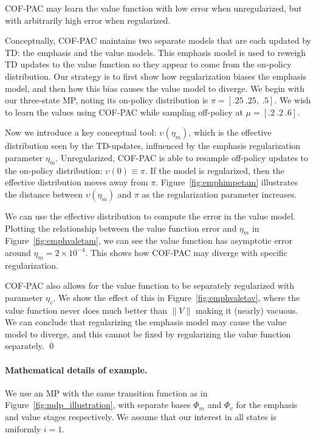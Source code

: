 \begin{example}\label{ex:emph}
	COF-PAC may learn the value function with low error when unregularized, but with arbitrarily high error when regularized.

	\proof Conceptually, COF-PAC maintains two separate models that are each updated by TD: the emphasis and the value models. This emphasis model is used to reweigh TD updates to the value function so they appear to come from the on-policy distribution. Our strategy is to first show how regularization biases the emphasis model, and then how this bias causes the value model to diverge.
	We begin with our three-state MP, noting its on-policy distribution is $\pi=[.25~.25,~.5]$. We wish to learn the values using COF-PAC while sampling off-policy at $\mu=[.2~.2~.6]$.

	Now we introduce a key conceptual tool: $\upsilon(\eta_m)$, which is the effective distribution seen by the TD-updates, influenced by the emphasis regularization parameter $\eta_m$. Unregularized, COF-PAC is able to resample off-policy updates to the on-policy distribution:  $\upsilon(0) \equiv \pi$. If the model is regularized, then the effective distribution moves away from $\pi$. Figure~\ref{fig:emphimpetam} illustrates the distance between $\upsilon(\eta_m)$ and $\pi$ as the regularization parameter increases.

	We can use the effective distribution to compute the error in the value model. Plotting the relationship between the value function error and $\eta_m$ in Figure~\ref{fig:emphvaletam}, we can see the value function has asymptotic error around $\eta_m=2\times 10^{-4}$. This shows how COF-PAC may diverge with specific regularization.

	COF-PAC also allows for the value function to be separately regularized with parameter $\eta_v$. We show the effect of this in Figure~\ref{fig:emphvaletav}, where the value function never does much better than $\|V\|$ making it (nearly) vacuous. We can conclude that regularizing the emphasis model may cause the value model to diverge, and this cannot be fixed by regularizing the value function separately. \qed{}
\end{example}

\paragraph{Mathematical details of example. } We use an MP with the same transition function as in Figure~\ref{fig:mdp_illustration}, with separate bases $\Phi_m$ and $\Phi_v$ for the emphasis and value stages respectively. We assume that our interest in all states is uniformly $i=1$.

